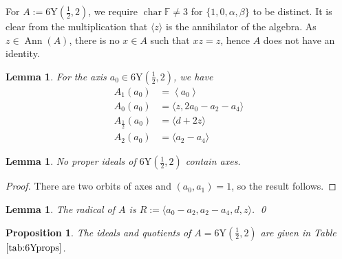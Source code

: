 \documentclass[11pt, a4paper]{article}
\theoremstyle{plain}
\newtheorem{lemma}[theorem]{Lemma}
\newtheorem{proposition}[theorem]{Proposition}
\theoremstyle{definition}
\newcommand\al{\alpha}
\newcommand\bt{\beta}
\newcommand\la{\langle}
\newcommand\ra{\rangle}
\DeclareMathOperator{\ch}{char}
\DeclareMathOperator{\Ann}{Ann}
\newcommand\FF{\mathbb{F}}
\newcommand{\Y}{\mathrm{Y}}
\newcommand{\0}{\overline{0}}
\newcommand{\2}{\overline{2}}
\newcommand{\1}{\mathbbm{1}}
\begin{document}
For $A:= 6\Y(\tfrac{1}{2}, 2)$, we require $\ch \FF  \neq 3$ for $\{1,0,\al,\bt\}$ to be distinct.  It is clear from the multiplication that $\la z \ra$ is the annihilator of the algebra. As $z \in \Ann(A)$, there is no $x\in A$ such that $xz=z$, hence $A$ does not have an identity.


\begin{lemma}
	For the axis $a_0 \in 6\Y(\tfrac{1}{2}, 2)$, we have
	\begin{align*}
		A_1(a_0) &= \left\la a_0 \right\ra  \\
		A_0(a_0) &= \la z, 2 a_0 - a_2 - a_4 \ra \\
		A_{\frac{1}{2}}(a_0) &= \la d+2z\ra \\
		A_{2}(a_0) &= \la a_2 - a_{4} \ra 
	\end{align*}
\end{lemma}



\begin{lemma}
No proper ideals of $6\Y(\frac{1}{2}, 2)$ contain axes.
\end{lemma}
\begin{proof}
There are two orbits of axes and $(a_0, a_1) = 1$, so the result follows.
\end{proof}





\begin{lemma}\label{6Y_radical}
The radical of $A$ is $R:= \la a_0-a_2, a_2-a_4,d,z \ra$. \qed
\end{lemma}

\begin{proposition}
	The ideals and quotients of $A = 6\Y(\tfrac{1}{2}, 2)$ are given in Table $\ref{tab:6Yprops}$.
\end{proposition}
\end{document}
